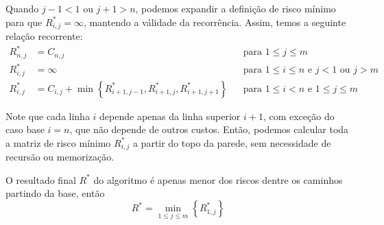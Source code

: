 Quando $j - 1 < 1$ ou $j + 1 > n$, podemos expandir a definição de risco mínimo para que $R^*_{i, j} = \infty$, mantendo a válidade da recorrência. Assim, temos a seguinte relação recorrente:
\begin{align*}
    R^*_{n, j} &= C_{n, j} && \text{para $1 \leq j \leq m$}\\
    R^*_{i, j} &= \infty && \text{para $1 \leq i \leq n$ e $j < 1$ ou $j > m$} \\
    R^*_{i, j} &= C_{i, j} + \min\left\{R^*_{i+1,j-1}, R^*_{i+1,j}, R^*_{i+1,j+1}\right\} && \text{para $1 \leq i < n$ e $1 \leq j \leq m$}
\end{align*}

Note que cada linha $i$ depende apenas da linha superior $i+1$, com exceção do caso base $i = n$, que não depende de outros custos. Então, podemos calcular toda a matriz de risco mínimo $R^*_{i, j}$ a partir do topo da parede, sem necessidade de recursão ou memorização.

O resultado final $R^*$ do algoritmo é apenas menor dos riscos dentre os caminhos partindo da base, então
\[
    R^* = \min_{1 \leq j \leq m}\left\{R^*_{1, j}\right\}
\]

